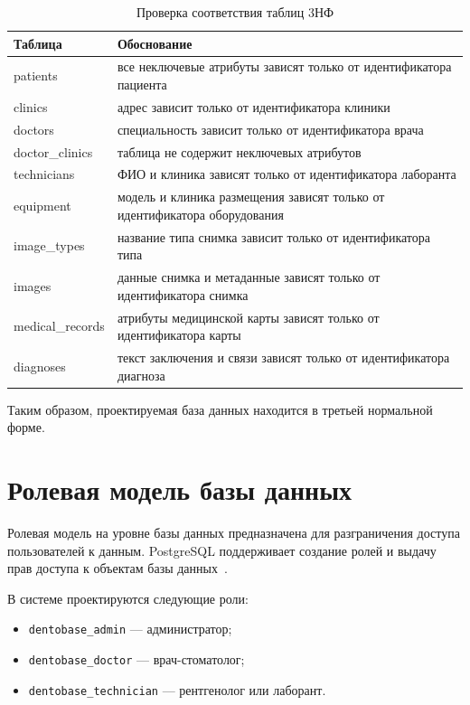 \begin{table}[H]
	\caption{Проверка соответствия таблиц 3НФ}
	\label{tab:3nf}
	\centering
	\small
	\begin{tabular}{|p{}|p{}|}
		\hline
		Таблица & Обоснование \\
		\hline
		patients & все неключевые атрибуты зависят только от идентификатора пациента \\
		\hline
		clinics & адрес зависит только от идентификатора клиники \\
		\hline
		doctors & специальность зависит только от идентификатора врача \\
		\hline
		doctor\_clinics & таблица не содержит неключевых атрибутов \\
		\hline
		technicians & ФИО и клиника зависят только от идентификатора лаборанта \\
		\hline
		equipment & модель и клиника размещения зависят только от идентификатора оборудования \\
		\hline
		image\_types & название типа снимка зависит только от идентификатора типа \\
		\hline
		images & данные снимка и метаданные зависят только от идентификатора снимка \\
		\hline
		medical\_records & атрибуты медицинской карты зависят только от идентификатора карты \\
		\hline
		diagnoses & текст заключения и связи зависят только от идентификатора диагноза \\
		\hline
	\end{tabular}
\end{table}

Таким образом, проектируемая база данных находится в третьей нормальной форме.

\section{Ролевая модель базы данных}

Ролевая модель на уровне базы данных предназначена для разграничения доступа пользователей к данным. PostgreSQL поддерживает создание ролей и выдачу прав доступа к объектам базы данных~\cite{postgresql-privileges}.

В системе проектируются следующие роли:
\begin{itemize}
	\item \texttt{dentobase\_admin} --- администратор;
	\item \texttt{dentobase\_doctor} --- врач-стоматолог;
	\item \texttt{dentobase\_technician} --- рентгенолог или лаборант.
\end{itemize}

